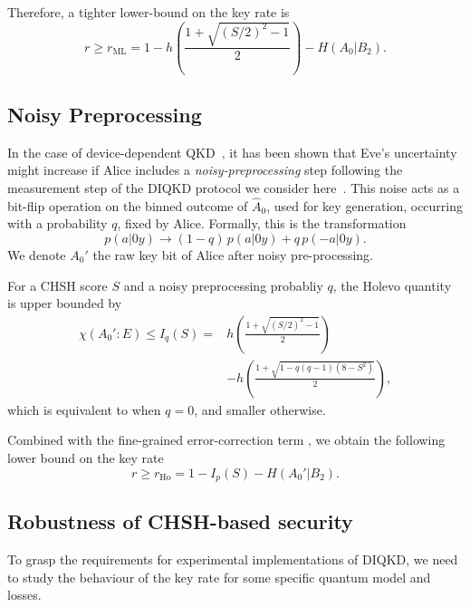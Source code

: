 Therefore, a tighter lower-bound on the key rate is
\begin{equation}
	r \geq r_\mathrm{ML} = 1 - h\left(\frac{1+\sqrt{(S/2)^2-1}}{2} \right) - H(A_0|B_2).
	\label{eq:Makr}
\end{equation}


\subsection{Noisy Preprocessing}

In the case of device-dependent QKD~\cite{Renner2005,Kraus2005,Renes2007}, it has been shown that Eve's uncertainty might increase if Alice includes a \textit{noisy-preprocessing} step following the measurement step of the DIQKD protocol we consider here~\cite{Ho2020}.
This noise acts as a bit-flip operation on the binned outcome of $\hat{A}_0$, used for key generation, occurring with a probability $q$, fixed by Alice.
Formally, this is the transformation
\begin{equation}
	p(a|0y) \rightarrow (1-q)\,p(a|0y) + q\, p(-a|0y).
\end{equation}
We denote $A_0'$ the raw key bit of Alice after noisy pre-processing.

For a CHSH score $S$ and a noisy preprocessing probabliy $q$, the Holevo quantity is upper bounded by
\begin{equation}
	\begin{split}
		\chi(A_0' : E) \leq I_q(S) = &h\left(\frac{1+\sqrt{(S/2)^2-1}}{2}\right) \\
									&-h\left(\frac{1+\sqrt{1-q(q-1)(8-S^2)}}{2} \right),
	\end{split}	
\end{equation}
which is equivalent to  when $q=0$, and smaller otherwise.

Combined with the fine-grained error-correction term , we obtain the following lower bound on the key rate
\begin{equation}
	r \geq r_\mathrm{Ho} = 1 - I_p(S) - H(A_0'|B_2).
	\label{eq:Ho}
\end{equation}


\subsection{Robustness of CHSH-based security}
\label{sec:robust_DIQKD}

To grasp the requirements for experimental implementations of DIQKD, we need to study the behaviour of the key rate for some specific quantum model and losses.

